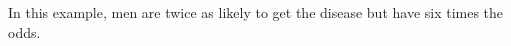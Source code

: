 \documentclass[11pt, chapterprefix=true]{scrbook}\usepackage[]{graphicx}\usepackage[]{color}
\begin{document}
In this example, men are twice as likely to get the disease but have six times the odds.

% 
% 
% 
% 
% 
% 
% 
% 
\end{document}
